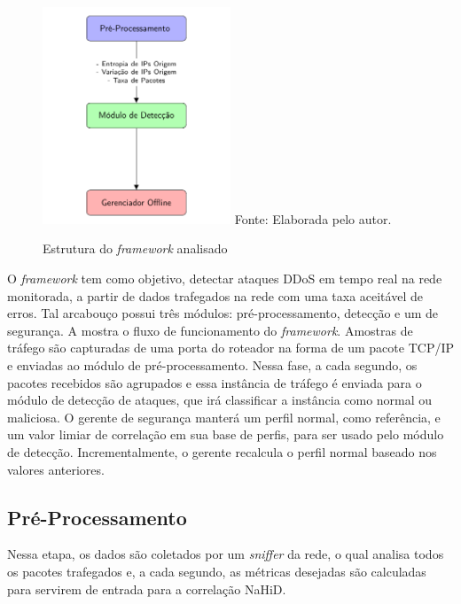  \begin{figure}[ht]
	\centering
	\caption{Estrutura do \textit{framework} analisado }
	\includegraphics[width=0.5\textwidth]{figs/fluxoFramework.pdf}
	{Fonte: Elaborada pelo autor.}
	\label{fig:Fluxo_Framework}
\end{figure}

O \textit{framework} tem como objetivo, detectar ataques DDoS em tempo real na rede monitorada, a partir de dados trafegados na rede com uma taxa aceitável de erros. Tal arcabouço possui três módulos: pré-processamento, detecção e um de segurança. A  mostra o fluxo de funcionamento do \textit{framework}. Amostras de tráfego são capturadas de uma porta do roteador na forma de um pacote TCP/IP e enviadas ao módulo de pré-processamento. Nessa fase, a cada segundo, os pacotes recebidos são agrupados e essa instância de tráfego é enviada para o módulo de detecção de ataques, que irá classificar a instância como normal ou maliciosa. O gerente de segurança manterá um perfil normal, como referência, e um valor limiar de correlação em sua base de perfis, para ser usado pelo módulo de detecção. Incrementalmente, o gerente recalcula o perfil normal baseado nos valores anteriores. 

\subsection{Pré-Processamento}
Nessa etapa, os dados são coletados por um \textit{sniffer} da rede, o qual analisa todos os pacotes trafegados e, a cada segundo, as métricas desejadas são calculadas para servirem de entrada para a correlação NaHiD. 

